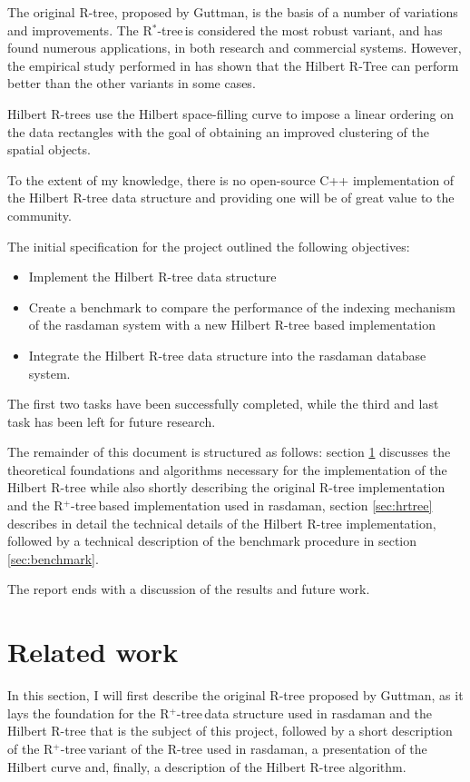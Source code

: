 \documentclass[11pt, a4paper, oneside]{article}
\newcommand{\rplus}{R$^+$-tree$\,$}
\newcommand{\rstar}{R$^*$-tree$\,$}
\begin{document}
The original R-tree, proposed by Guttman, is the basis of a number of variations and improvements\cite{Manolopoulos:2005:RTA:1098699}. The \rstar is considered the most robust variant, and has found numerous applications, in both research and commercial systems. However, the empirical study performed in \cite{Kamel:1994:HRI:645920.673001} has shown that the Hilbert R-Tree can perform better than the other variants in some cases.

Hilbert R-trees use the Hilbert space-filling curve to impose a linear ordering on the data rectangles with the goal of obtaining an improved clustering of the spatial objects.

To the extent of my knowledge, there is no open-source C++ implementation of the Hilbert R-tree data structure and providing one will be of great value to the community.

The initial specification for the project outlined the following objectives:
\begin{itemize}
\item Implement the Hilbert R-tree data structure
\item Create a benchmark to compare the performance of the indexing mechanism of the rasdaman system with a new Hilbert R-tree based implementation
\item Integrate the Hilbert R-tree data structure into the rasdaman database system.
\end{itemize}

The first two tasks have been successfully completed, while the third and last task has been left for future research.

The remainder of this document is structured as follows: section \ref{sec:related} discusses the theoretical foundations and algorithms necessary for the implementation of the Hilbert R-tree while also shortly describing the original R-tree implementation and the \rplus based implementation used in rasdaman, section \ref{sec:hrtree} describes in detail the technical details of the Hilbert R-tree implementation, followed by a technical description of the benchmark procedure in section \ref{sec:benchmark}.

The report ends with a discussion of the results and future work.

\section{Related work}
\label{sec:related}

In this section, I will first describe the original R-tree proposed by Guttman, as it lays the foundation for the \rplus data structure used in rasdaman and the Hilbert R-tree that is the subject of this project, followed by a short description of the \rplus variant of the R-tree used in rasdaman, a presentation of the Hilbert curve and, finally, a description of the Hilbert R-tree algorithm.
\end{document}
